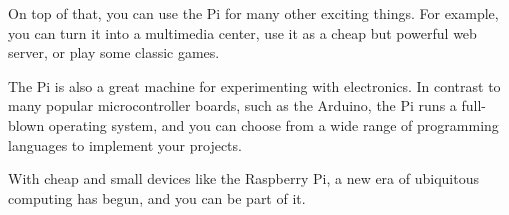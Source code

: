 On top of that, you can use the Pi for many other
exciting things. For example, you can turn it into a multimedia center, use it as a cheap but powerful web server, or play some classic games.
\newline

The Pi is also a great machine for experimenting with electronics. In contrast
to many popular microcontroller boards, such as the Arduino, the Pi runs a
full-blown operating system, and you can choose from a wide range of programming
languages to implement your projects.
\newline

With cheap and small devices like the Raspberry Pi, a new era of ubiquitous
computing has begun, and you can be part of it.